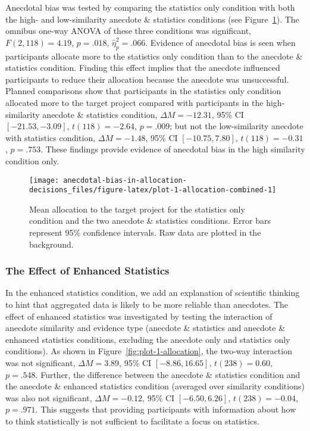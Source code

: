 \documentclass[
  man, donotrepeattitle,floatsintext]{apa7}
\theoremstyle{definition}
\theoremstyle{definition}
\theoremstyle{definition}
\theoremstyle{definition}
\theoremstyle{remark}
\begin{document}
Anecdotal bias was tested by comparing the statistics only condition with both
the high- and low-similarity anecdote \& statistics conditions (see
Figure~\ref{fig:plot-1-allocation-combined}). The omnibus one-way
ANOVA of these three conditions was significant,
\(F(2, 118) = 4.19\), \(p = .018\), \(\hat{\eta}^2_p = .066\).
Evidence of anecdotal bias is seen when participants allocate more to the
statistics only condition than to the anecdote \& statistics condition. Finding
this effect implies that the anecdote influenced participants to reduce their
allocation because the anecdote was unsuccessful. Planned comparisons show that
participants in the statistics only condition allocated more to the target
project compared with participants in the high-similarity anecdote \& statistics
condition,
\(\Delta M = -12.31\), 95\% CI \([-21.53, -3.09]\), \(t(118) = -2.64\), \(p = .009\); but not
the low-similarity anecdote with statistics condition,
\(\Delta M = -1.48\), 95\% CI \([-10.75, 7.80]\), \(t(118) = -0.31\), \(p = .753\). These findings
provide evidence of anecdotal bias in the high similarity condition only.



\begin{figure}
\texttt{[image: anecdotal-bias-in-allocation-decisions\_files/figure-latex/plot-1-allocation-combined-1]} \caption{Mean allocation to the target project for the statistics only condition and the two anecdote \& statistics conditions. Error bars represent 95\% confidence intervals. Raw data are plotted in the background.}\label{fig:plot-1-allocation-combined}
\end{figure}

\hypertarget{the-effect-of-enhanced-statistics}{%
\subsubsection{The Effect of Enhanced Statistics}\label{the-effect-of-enhanced-statistics}}

In the enhanced statistics condition, we add an explanation of scientific
thinking to hint that aggregated data is likely to be more reliable than
anecdotes. The effect of enhanced statistics was investigated by testing the
interaction of anecdote similarity and evidence type (anecdote \& statistics and
anecdote \& enhanced statistics conditions, excluding the anecdote only and
statistics only conditions). As shown in
Figure~\ref{fig:plot-1-allocation}, the two-way interaction was not
significant, \(\Delta M = 3.89\), 95\% CI \([-8.86, 16.65]\), \(t(238) = 0.60\), \(p = .548\). Further, the
difference between the anecdote \& statistics condition and the anecdote \&
enhanced statistics condition (averaged over similarity conditions) was also not
significant, \(\Delta M = -0.12\), 95\% CI \([-6.50, 6.26]\), \(t(238) = -0.04\), \(p = .971\). This suggests that
providing participants with information about how to think statistically is not
sufficient to facilitate a focus on statistics.
\end{document}
